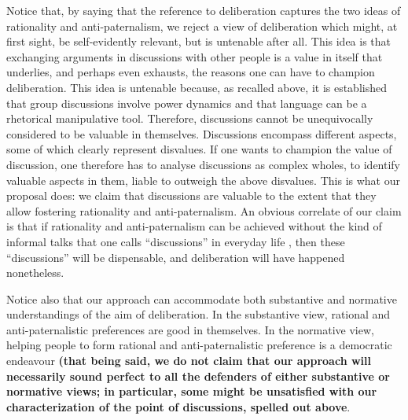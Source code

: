 \documentclass[a4paper, 11pt]{article}
\begin{document}

Notice that, by saying that the reference to deliberation captures the two ideas of rationality and anti-paternalism, we reject a view of deliberation which might, at first sight, be self-evidently relevant, but is untenable after all. This idea is that exchanging arguments in discussions with other people is a value in itself that underlies, and perhaps even exhausts, the reasons one can have to champion deliberation. %
This idea is untenable because, as recalled above, it is established that group discussions involve power dynamics and that language can be a rhetorical manipulative tool. Therefore, discussions cannot be unequivocally considered to be valuable in themselves. Discussions encompass different aspects, some of which clearly represent disvalues. If one wants to champion the value of discussion, one therefore has to analyse discussions as complex wholes, to identify valuable aspects in them, liable to outweigh the above disvalues. This is what our proposal does: we claim that discussions are valuable to the extent that they allow fostering rationality and anti-paternalism. An obvious correlate of our claim is that if rationality and anti-paternalism can be achieved without the kind of informal talks that one calls “discussions” in everyday life%
, then these “discussions” will be dispensable, and deliberation will have happened nonetheless.

Notice also that our approach can accommodate both substantive and normative understandings of the aim of deliberation. In the substantive view, rational and anti-paternalistic preferences are good in themselves. In the normative view, helping people to form rational and anti-paternalistic preference is a democratic endeavour \textbf{(that being said, we do not claim that our approach will necessarily sound perfect to all the defenders of either substantive or normative views; in particular, some might be unsatisfied with our characterization of the point of discussions, spelled out above}.
\end{document}
